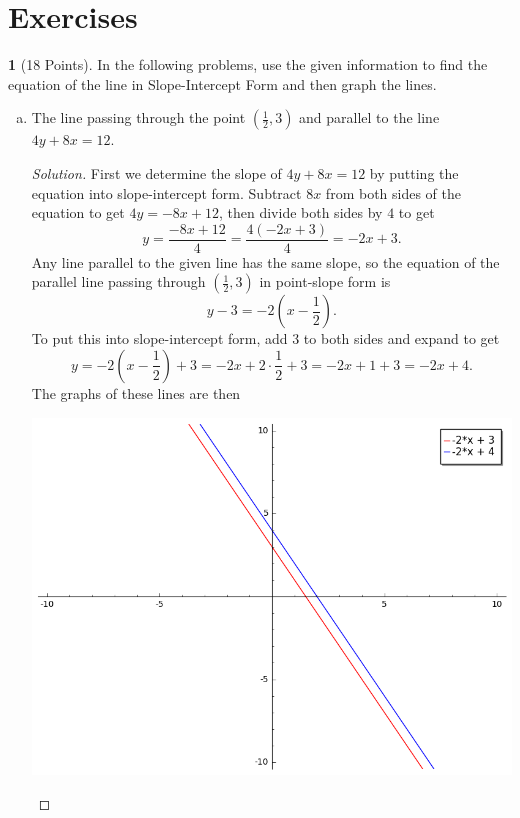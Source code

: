 \documentclass[12pt]{amsart}
\theoremstyle{definition}
\newtheorem{thm}{}
\theoremstyle{definition}
\begin{document}
\section{Exercises}

\begin{thm}[18 Points]\label{ex5}
  In the following problems, use the given information to find the equation of the line in Slope-Intercept Form and then graph the lines.
  \begin{enumerate}[(a)]
  \item
    The line passing through the point $\left(\frac{1}{2}, 3\right)$ and parallel to the line $4y + 8x = 12$.
    \begin{proof}[Solution]
      First we determine the slope of $4y + 8x = 12$ by putting the equation into slope-intercept form.
      Subtract $8x$ from both sides of the equation to get $4y = -8x + 12$, then divide both sides by $4$ to get
      $$y = \frac{-8x + 12}{4} = \frac{4(-2x + 3)}{4} = -2x + 3.$$
      Any line parallel to the given line has the same slope, so the equation of the parallel line passing through $\left(\frac{1}{2},3\right)$ in point-slope form is 
      $$y - 3 = -2\left(x - \frac{1}{2}\right).$$
      To put this into slope-intercept form, add 3 to both sides and expand to get
      $$y = -2\left(x - \frac{1}{2}\right) + 3 = -2x + 2\cdot\frac{1}{2} + 3 = -2x + 1 + 3 = -2x + 4.$$
      The graphs of these lines are then
      \begin{center}
        \includegraphics[scale=0.5]{imgs/ParallelLines.png}
      \end{center}
    \end{proof}

\end{enumerate}
\end{thm}
\end{document}
